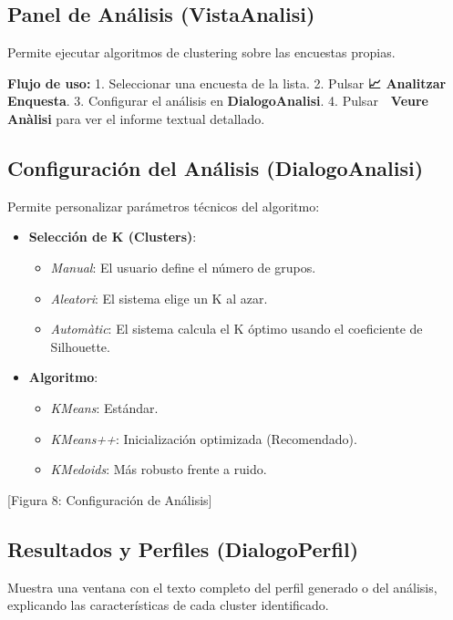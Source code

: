 \documentclass[a4paper,12pt]{article}
\begin{document}
\subsection{Panel de Análisis (VistaAnalisi)}
Permite ejecutar algoritmos de clustering sobre las encuestas propias.

\textbf{Flujo de uso:}
1. Seleccionar una encuesta de la lista.
2. Pulsar \textbf{📈 Analitzar Enquesta}.
3. Configurar el análisis en \textbf{DialogoAnalisi}.
4. Pulsar \textbf{📁 Veure Anàlisi} para ver el informe textual detallado.

\subsection{Configuración del Análisis (DialogoAnalisi)}
Permite personalizar parámetros técnicos del algoritmo:
\begin{itemize}
    \item \textbf{Selección de K (Clusters)}:
        \begin{itemize}
            \item \textit{Manual}: El usuario define el número de grupos.
            \item \textit{Aleatori}: El sistema elige un K al azar.
            \item \textit{Automàtic}: El sistema calcula el K óptimo usando el coeficiente de Silhouette.
        \end{itemize}
    \item \textbf{Algoritmo}:
        \begin{itemize}
            \item \textit{KMeans}: Estándar.
            \item \textit{KMeans++}: Inicialización optimizada (Recomendado).
            \item \textit{KMedoids}: Más robusto frente a ruido.
        \end{itemize}
\end{itemize}
[Figura 8: Configuración de Análisis]

\subsection{Resultados y Perfiles (DialogoPerfil)}
Muestra una ventana con el texto completo del perfil generado o del análisis, explicando las características de cada cluster identificado.
\end{document}
